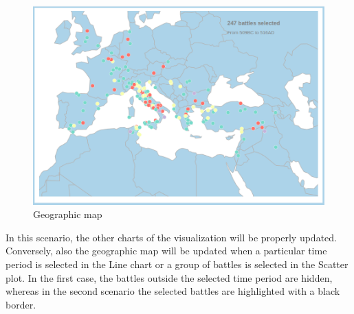 \begin{figure}[h]
    \centering
    \includegraphics[scale=0.20]{./images/geographic_map.png}
    \caption{Geographic map}
\end{figure}

In this scenario, the other charts of the visualization will be properly updated.
Conversely, also the geographic map will be updated when a particular time period is selected in the Line chart or a group of battles is selected in the Scatter plot.
In the first case, the battles outside the selected time period are hidden, whereas in the second scenario the selected battles are highlighted with a black border.

